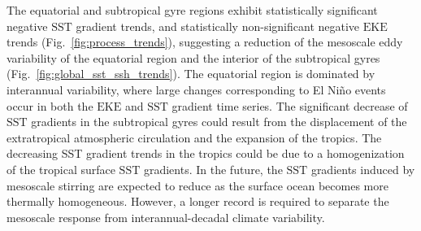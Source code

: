 \documentclass{nature}
\newcommand{\EKE}{\text{EKE}}
\newcommand{\SST}{\text{SST}}
\begin{document}
The equatorial and subtropical gyre regions exhibit statistically significant negative $\SST$ gradient trends, and statistically non-significant negative $\EKE$ trends (Fig.~\ref{fig:process_trends}), suggesting a reduction of the mesoscale eddy variability of the equatorial region and the interior of the subtropical gyres (Fig.~\ref{fig:global_sst_ssh_trends}). The equatorial region is dominated by interannual variability, where large changes corresponding to El Ni\~no events occur in both the $\EKE$ and $\SST$ gradient time series. The significant decrease of $\SST$ gradients in the subtropical gyres could result from the displacement of the extratropical atmospheric circulation\cite{Saenko_response_2005,Gupta_changes_2009} and the expansion of the tropics\cite{Seidel_widening_2007}.  The decreasing SST gradient trends in the tropics could be due to a homogenization of the tropical surface $\SST$ gradients. In the future, the $\SST$ gradients induced by mesoscale stirring are expected to reduce as the surface ocean becomes more thermally homogeneous. However, a longer record is required to separate the mesoscale response from interannual-decadal climate variability. 
\end{document}
